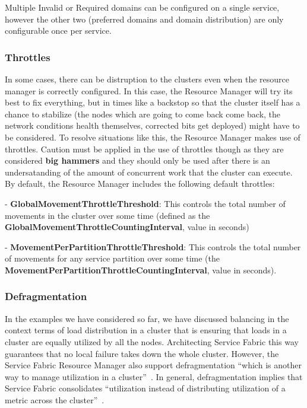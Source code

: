 Multiple Invalid or Required domains can be configured on a single
service, however the other two (preferred domains and domain
distribution) are only configurable once per service.

\subsubsection{Throttles}
In some cases, there can be distruption to the clusters
even when the resource manager is correctly configured. 
In this case, the Resource Manager will try its best to fix
everything, but in times like a backstop so that the cluster itself
has a chance to stabilize (the nodes which are going to come back come
back, the network conditions health themselves, corrected bits get
deployed) might have to be considered. To resolve situations like this, 
the Resource Manager makes use of throttles. Caution must be applied in 
the use of throttles though
as they are considered {\bf big hammers} and they should only be used after 
there is an undersatanding of the amount of
concurrent work that the cluster can execute. 
By default, the Resource Manager includes the
following default throttles:


- {\bf GlobalMovementThrottleThreshold}: This controls the
  total number of movements in the cluster over some time
  (defined as the
  {\bf GlobalMovementThrottleCountingInterval}, value in seconds)

- {\bf MovementPerPartitionThrottleThreshold}: This controls
  the total
  number of movements for any service partition 
  over some time (the
  {\bf MovementPerPartitionThrottleCountingInterval}, 
  value in seconds).


\subsubsection{Defragmentation}
In the examples we have considered so far, we have discussed balancing
in the context terms of load distribution in a cluster that is 
ensuring that loads in a cluster are equally utilized by all the
nodes. Architecting Service Fabric this way guarantees that no local
failure takes down the whole cluster.  However, the Service Fabric
Resource Manager also support defragmentation ``which is another way to
manage utilization in a cluster''~\cite{hid-sp18-501-defrag}. 
In general, defragmentation implies
that Service Fabric consolidates ``utilization instead of distributing
utilization of a metric across the cluster''~\cite{hid-sp18-501-defrag}.

